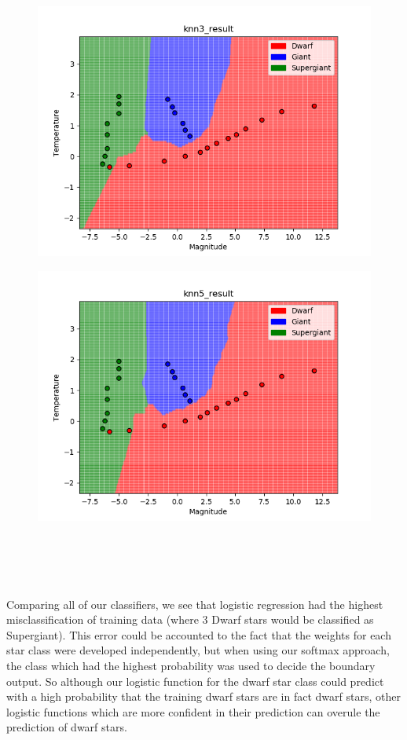 \documentclass[submit]{harvardml}
\begin{document}
\begin{enumerate}
\begin{figure} [h!]
        \includegraphics[height=0.4\textheight]{HW2/knn3_result.png}
    \end{figure}
    \begin{figure} [h!]
        \centering
        \includegraphics[height=0.4\textheight]{HW2/knn5_result.png}
    \end{figure}
    \newpage
    \newpage
    \newpage \\ \\ \\ \\ 
    Comparing all of our classifiers, we see that logistic regression had the highest misclassification of training data (where 3 Dwarf stars would be classified as Supergiant). This error could be accounted to the fact that the weights for each star class were developed independently, but when using our softmax approach, the class which had the highest probability was used to decide the boundary output. So although our logistic function for the dwarf star class could predict with a high probability that the training dwarf stars are in fact dwarf stars, other logistic functions which are more confident in their prediction can overule the prediction of dwarf stars. \\

\end{enumerate}
\end{document}
